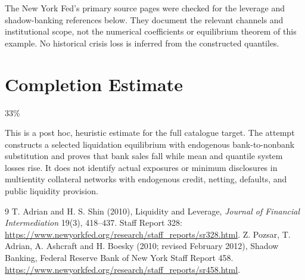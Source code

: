 \documentclass[11pt]{article}
\theoremstyle{remark}\newtheorem{remark}[theorem]{Remark}
\begin{document}
The New York Fed's primary source pages were checked for the leverage and shadow-banking references below. They document the relevant channels and institutional scope, not the numerical coefficients or equilibrium theorem of this example. No historical crisis loss is inferred from the constructed quantiles.

\section{Completion Estimate}
33\%

This is a post hoc, heuristic estimate for the full catalogue target.
The attempt constructs a selected liquidation equilibrium with endogenous bank-to-nonbank substitution and proves that bank sales fall while mean and quantile system losses rise. It does not identify actual exposures or minimum disclosures in multientity collateral networks with endogenous credit, netting, defaults, and public liquidity provision.

\begin{thebibliography}{9}
 T. Adrian and H. S. Shin (2010), Liquidity and Leverage, \emph{Journal of Financial Intermediation} 19(3), 418--437. Staff Report 328: \url{https://www.newyorkfed.org/research/staff_reports/sr328.html}.
 Z. Pozsar, T. Adrian, A. Ashcraft and H. Boesky (2010; revised February 2012), Shadow Banking, Federal Reserve Bank of New York Staff Report 458. \url{https://www.newyorkfed.org/research/staff_reports/sr458.html}.
\end{thebibliography}
\end{document}
